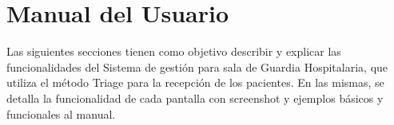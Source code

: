 \section{Manual del Usuario}
Las siguientes secciones tienen como objetivo describir y explicar las funcionalidades del Sistema de gestión para sala de Guardia Hospitalaria, que utiliza el método Triage para la recepción de los pacientes. En las mismas, se detalla la funcionalidad de cada pantalla con screenshot y ejemplos básicos y funcionales al manual.

